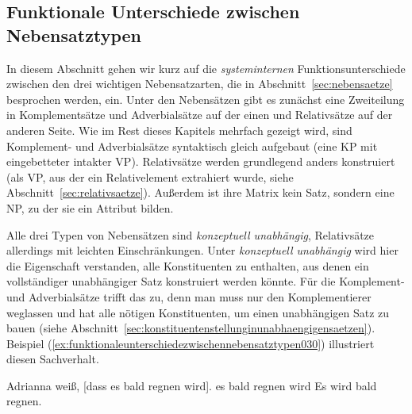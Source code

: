 \subsection{Funktionale Unterschiede zwischen Nebensatztypen}
\label{sec:funktionaleunterschiedezwischennebensatztypen}

In diesem Abschnitt gehen wir kurz auf die \textit{systeminternen} Funktionsunterschiede zwischen den drei wichtigen Nebensatzarten, die in Abschnitt~\ref{sec:nebensaetze} besprochen werden, ein.
Unter den Nebensätzen gibt es zunächst eine Zweiteilung in Komplementsätze und Adverbialsätze auf der einen und Relativsätze auf der anderen Seite.
Wie im Rest dieses Kapitels mehrfach gezeigt wird, sind Komplement- und Adverbialsätze syntaktisch gleich aufgebaut (eine KP mit eingebetteter intakter VP).
Relativsätze werden grundlegend anders konstruiert (als VP, aus der ein Relativelement extrahiert wurde, siehe Abschnitt~\ref{sec:relativsaetze}).
Außerdem ist ihre Matrix kein Satz, sondern eine NP, zu der sie ein Attribut bilden.

Alle drei Typen von Nebensätzen sind \textit{konzeptuell unabhängig}, Relativsätze allerdings mit leichten Einschränkungen.
Unter \textit{konzeptuell unabhängig} wird hier die Eigenschaft verstanden, alle Konstituenten zu enthalten, aus denen ein vollständiger unabhängiger Satz konstruiert werden könnte.
Für die Komplement- und Adverbialsätze trifft das zu, denn man muss nur den Komplementierer weglassen und hat alle nötigen Konstituenten, um einen unabhängigen Satz zu bauen (siehe Abschnitt~\ref{sec:konstituentenstellunginunabhaengigensaetzen}).
Beispiel (\ref{ex:funktionaleunterschiedezwischennebensatztypen030}) illustriert diesen Sachverhalt.

\begin{exe}
  \ex\label{ex:funktionaleunterschiedezwischennebensatztypen030}
  \begin{xlist}
    \ex\label{ex:funktionaleunterschiedezwischennebensatztypen031} Adrianna weiß, [dass es bald regnen wird].
    \ex\label{ex:funktionaleunterschiedezwischennebensatztypen032} es bald regnen wird
    \ex\label{ex:funktionaleunterschiedezwischennebensatztypen033} Es wird bald regnen.
  \end{xlist}
\end{exe}

